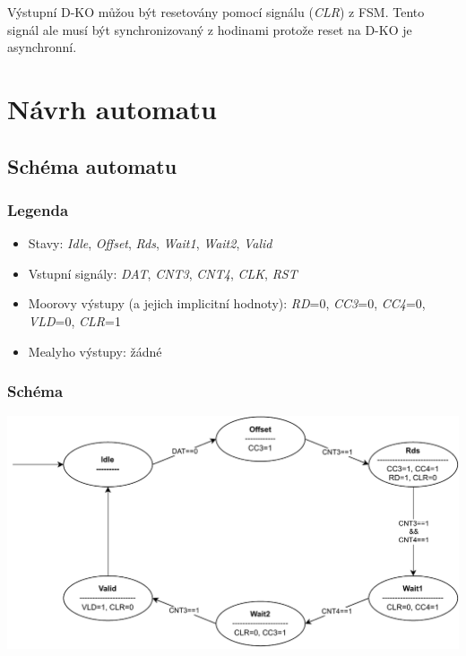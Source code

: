 \documentclass{article}
\begin{document}
Výstupní D-KO můžou být resetovány pomocí signálu (\emph{CLR}) z FSM. Tento
signál ale musí být synchronizovaný z hodinami protože reset na D-KO je
asynchronní.

\newpage

\section{Návrh automatu}

\subsection{Schéma automatu}

\subsubsection{Legenda}

\begin{itemize}
    \item Stavy: \emph{Idle}, \emph{Offset}, \emph{Rds}, \emph{Wait1},
          \emph{Wait2}, \emph{Valid}
    \item Vstupní signály: \emph{DAT}, \emph{CNT3}, \emph{CNT4}, \emph{CLK},
          \emph{RST}
    \item Moorovy výstupy (a jejich implicitní hodnoty): \emph{RD}=0,
          \emph{CC3}=0, \emph{CC4}=0, \emph{VLD}=0, \emph{CLR}=1
    \item Mealyho výstupy: žádné
\end{itemize}

\subsubsection{Schéma}

\includegraphics*[scale=0.9]{assets/FSM.pdf}
\end{document}
